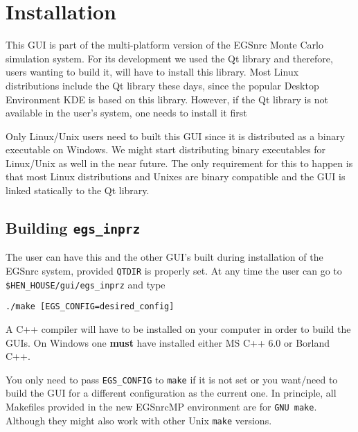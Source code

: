 \documentclass[12pt,twoside]{article}   %
\begin{document}
\newpage
\section{Installation}
\label{installation}


This GUI is part of the multi-platform version\cite{Ka03}
of the EGSnrc Monte Carlo simulation system\cite{Ka09a}.
For its development we used the Qt library and therefore,
users wanting to build it, will have to install this library. Most Linux distributions include the
Qt library these days, since the popular Desktop Environment KDE is based on this library. However,
if the Qt library is not available in the user's system, one needs to install it first

Only Linux/Unix users need to built this GUI since it is distributed as a binary executable on
Windows. We might start distributing binary executables for Linux/Unix as well in the near future.
The only requirement for this to happen is that most Linux distributions and Unixes are binary
compatible and the GUI is linked statically to the Qt library.




\subsection{Building {\tt egs\_inprz}}
\label{building}

The user can have this and the other GUI's built during installation of the EGSnrc system,
provided {\tt QTDIR} is properly set. At any time the user can go to
{\tt \$HEN\_HOUSE/gui/egs\_inprz} and type

      {\tt ./make [EGS\_CONFIG=desired\_config]}

\noindent A C++ compiler will have to be installed on
your computer in order to build the GUIs.
On Windows one {\bf must} have installed either MS C++ 6.0 or Borland C++.

 You only need to pass {\tt EGS\_CONFIG} to {\tt make} if it is not set
or you want/need to build the GUI for a different configuration as the current one.
In principle, all Makefiles provided in the new EGSnrcMP environment are for {\tt GNU make}.
Although they might also work with other Unix {\tt make} versions.
\end{document}
